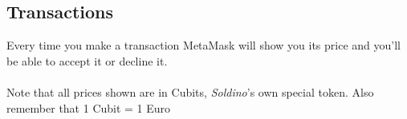 	\subsection{Transactions}
	Every time you make a transaction MetaMask will show you its price and you'll
	be able to accept it or decline it.\\ \\
	Note that all prices shown are in Cubits, \textit{Soldino}'s own special token.
	Also remember that 1 Cubit = 1 Euro
	
	
	
	